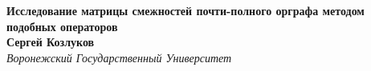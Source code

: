 \documentclass[12pt]{article}
\begin{document}
 

\begin{center}
    \textbf{
    Исследование матрицы смежностей
    почти-полного орграфа
    методом подобных операторов}\\[3mm]
    \textbf{Сергей Козлуков}\\[2mm]
    \emph{Воронежский Государственный Университет}
\end{center}


{}

\end{document}
